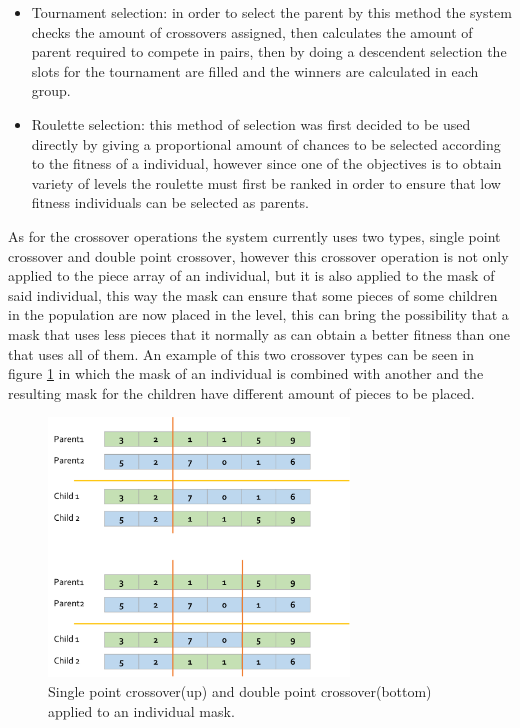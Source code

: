 \documentclass[conference]{IEEEtran}
\begin{document}
    \begin{itemize}
        \item Tournament selection: in order to select the parent by this method the
        system checks the amount of crossovers assigned, then calculates the amount
        of parent required to compete in pairs, then by doing a descendent selection
        the slots for the tournament are filled and the winners are calculated in
        each group.
        \item Roulette selection: this method of selection was first decided to be
        used directly by giving a proportional amount of chances to be selected
        according to the fitness of a individual, however since one of the
        objectives is to obtain variety of levels the roulette must first be ranked
        in order to ensure that low fitness individuals can be selected as parents.
    \end{itemize}
    
    As for the crossover operations the system currently uses two types, single
    point crossover and double point crossover, however this crossover operation is
    not only applied to the piece array of an individual, but it is also applied to
    the mask of said individual, this way the mask can ensure that some pieces of
    some children in the population are now placed in the level, this can bring the
    possibility that a mask that uses less pieces that it normally as can obtain a
    better fitness than one that uses all of them. An example of this two crossover
    types can be seen in figure \ref{crossover} in which the mask of an individual
    is combined with another and the resulting mask for the children have different
    amount of pieces to be placed.
    
    \begin{figure}[htbp]
        \centerline{\includegraphics[width=80mm]{Images/crossover.png}}
        \caption{Single point crossover(up) and double point crossover(bottom) applied to an individual mask.}
        \label{crossover}
    \end{figure}
    
\end{document}
